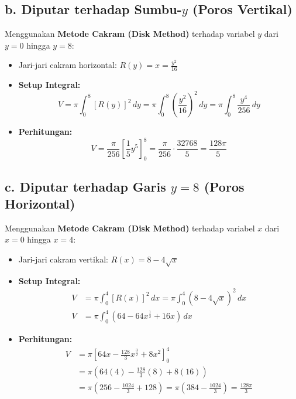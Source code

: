 \documentclass[12pt,a4paper]{article}
\begin{document}
\subsection*{b. Diputar terhadap Sumbu-$y$ (Poros Vertikal)}
Menggunakan \textbf{Metode Cakram (Disk Method)} terhadap variabel $y$ dari $y = 0$ hingga $y = 8$:
\begin{itemize}
  \item Jari-jari cakram horizontal: $R(y) = x = \frac{y^2}{16}$
  \item \textbf{Setup Integral:}
    \begin{equation*}
      V = \pi \int_{0}^{8} [R(y)]^2 \, dy = \pi \int_{0}^{8} \left(\frac{y^2}{16}\right)^2 \, dy = \pi \int_{0}^{8} \frac{y^4}{256} \, dy
    \end{equation*}
  \item \textbf{Perhitungan:}
    \begin{equation*}
      V = \frac{\pi}{256} \left[ \frac{1}{5}y^5 \right]_{0}^{8} = \frac{\pi}{256} \cdot \frac{32768}{5} = \frac{128\pi}{5}
    \end{equation*}
\end{itemize}

\subsection*{c. Diputar terhadap Garis $y = 8$ (Poros Horizontal)}
Menggunakan \textbf{Metode Cakram (Disk Method)} terhadap variabel $x$ dari $x = 0$ hingga $x = 4$:
\begin{itemize}
  \item Jari-jari cakram vertikal: $R(x) = 8 - 4\sqrt{x}$
  \item \textbf{Setup Integral:}
    \begin{align*}
      V &= \pi \int_{0}^{4} [R(x)]^2 \, dx = \pi \int_{0}^{4} (8 - 4\sqrt{x})^2 \, dx \\
      V &= \pi \int_{0}^{4} (64 - 64x^{\frac{1}{2}} + 16x) \, dx
    \end{align*}
  \item \textbf{Perhitungan:}
    \begin{align*}
      V &= \pi \left[ 64x - \frac{128}{3}x^{\frac{3}{2}} + 8x^2 \right]_{0}^{4} \\
      &= \pi \left( 64(4) - \frac{128}{3}(8) + 8(16) \right) \\
      &= \pi \left( 256 - \frac{1024}{3} + 128 \right) = \pi \left( 384 - \frac{1024}{3} \right) = \frac{128\pi}{3}
    \end{align*}
\end{itemize}
\end{document}

